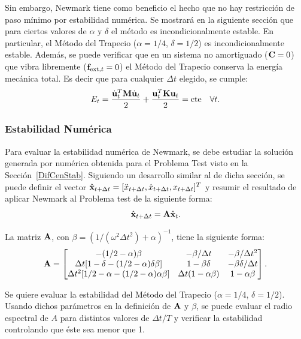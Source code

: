 Sin embargo, Newmark tiene como beneficio el hecho que no hay restricción de paso mínimo por estabilidad numérica. Se mostrará en la siguiente sección que para ciertos valores de $\alpha$ y $\delta$ el método es incondicionalmente estable. %
%
En particular, el Método del Trapecio ($\alpha=1/4$, $\delta=1/2$) es incondicionalmente estable. Además, se puede verificar que en un sistema no amortiguado (${\bf C}=0$) que vibra libremente (${\bf f}_{\text{ext},t}=0$) el Método del Trapecio conserva la energía mecánica total. Es decir que para cualquier $\Delta t$ elegido, se cumple:
%
\begin{equation}
	E_t=\frac{\dot{{\bf u}}_t^T{\bf M}\dot{{\bf u}}_t}{2} + \frac{{\bf u}_t^T{\bf K} {\bf u}_t}{2}=\text{cte} \quad  \forall t.
\end{equation} 


\subsubsection{Estabilidad Numérica}

Para evaluar la estabilidad numérica de Newmark, se debe estudiar la solución generada por numérica obtenida para el Problema Test visto en la Sección~\ref{DifCenStab}. %
%
Siguiendo un desarrollo similar al de dicha sección, se puede definir el vector $\hat{{\bf x}}_{t+\Delta t}=[\ddot{x}_{t+\Delta t},\dot{x}_{t+\Delta t},x_{t+\Delta t}]^T$ y resumir el resultado de aplicar Newmark al Problema test de la siguiente forma:
%
\begin{equation}
\hat{{\bf x}}_{t+\Delta t} = {\bf A} 	\hat{{\bf x}}_{t}.
\end{equation}

La matriz ${\bf A}$, con $\beta = (1/(\omega^2\Delta t^2)+\alpha)^{-1}$, tiene la siguiente forma:
%
\begin{equation}{\bf A}=
	\left[\begin{matrix}
	-(1/2-\alpha)\beta & -\beta/\Delta t & -\beta/\Delta t^2 \\
	\Delta t[1-\delta-(1/2-\alpha)\delta\beta] & 1-\beta\delta & -\beta\delta/\Delta t \\
	\Delta t^2[1/2-\alpha-(1/2-\alpha)\alpha\beta] & \Delta t(1-\alpha\beta) & 1-\alpha\beta 
	\end{matrix}\right].
\end{equation}

Se quiere evaluar la estabilidad del Método del Trapecio ($\alpha=1/4$, $\delta=1/2$). Usando dichos parámetros en la definición de ${\bf A}$ y $\beta$, se puede evaluar el radio espectral de $A$ para distintos valores de $\Delta t/T$ y verificar la estabilidad controlando que éste sea menor que 1.

